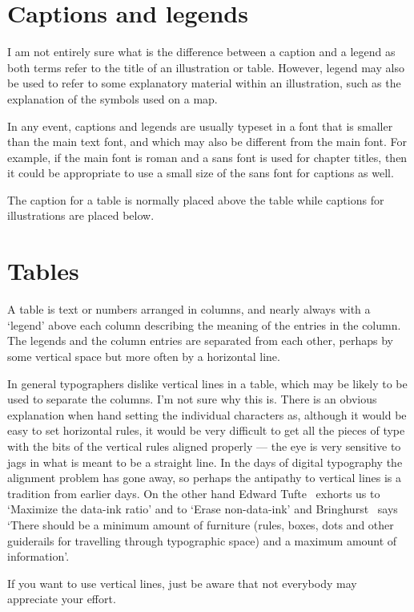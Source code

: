\documentclass[10pt,a4paper,extrafontsizes]{memoir}
\begin{document}
\section{Captions and legends}

\begin{paracol}{2}
\switchEng
    I am not entirely sure what is the difference between a
caption and a legend as both terms refer to the title of an 
illustration or table. 
However, legend may also be used to refer to some explanatory 
material within an illustration, such as the 
explanation of the symbols used on a map.

    In any event, captions and legends are usually typeset in a font that
is smaller than the main text font, and which may also be different from the
main font. For example, if the main font is roman and a sans font is used
for chapter titles, then it could be appropriate to use a small size
of the sans font for captions as well.

    The caption for a table is normally placed above the 
table while captions for illustrations are placed below.
\end{paracol}

\section{Tables}

\begin{paracol}{2}
\switchEng
    A table is text or numbers arranged in columns, 
and nearly always
with a `legend' above each column describing the meaning of
the entries in the column. The legends and the column entries are
separated from each other, perhaps by some vertical space but more often
by a horizontal line.

    In general typographers dislike vertical lines in a table, which may
be likely to be used to separate the columns. I'm not sure why this is.
There is an obvious explanation when hand setting the individual characters
as, although it would be easy to set horizontal rules, it would be very 
difficult to get all the pieces of type with the bits of the vertical rules
aligned properly --- the eye is very sensitive to jags in what is meant to
be a straight line. In the days of digital typography the alignment problem
has gone away, so perhaps the antipathy to vertical lines is a tradition
from earlier days. On the other hand Edward Tufte~\autocite[p. 96]{TUFTE83} 
exhorts us to `Maximize the data-ink ratio' and to `Erase non-data-ink'
and Bringhurst~\autocite[p. 70]{BRINGHURST99} says `There should be a minimum
amount of furniture (rules, boxes, dots and other guiderails for
travelling through typographic space) and a maximum amount
of information'.

    If you want to use vertical lines, just be aware that not everybody
may appreciate your effort.
\end{paracol}
\end{document}
